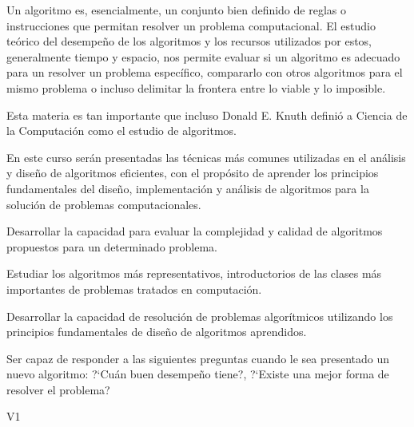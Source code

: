 \begin{syllabus}


\begin{justification}

    Un algoritmo es, esencialmente, un conjunto bien definido de reglas o instrucciones
    que permitan resolver un problema computacional. El estudio teórico del desempeño
    de los algoritmos y los recursos utilizados por estos, generalmente tiempo y espacio, 
    nos permite evaluar si un algoritmo es adecuado para un resolver un problema 
    específico, compararlo con otros algoritmos para el mismo problema o incluso
    delimitar la frontera entre lo viable y lo imposible.
    
    Esta materia es tan importante que incluso Donald E. Knuth definió a
    Ciencia de la Computación como el estudio de algoritmos.
    
    En este curso serán presentadas las técnicas más comunes utilizadas en el análisis y diseño de 
    algoritmos eficientes, con el propósito de aprender los principios fundamentales
    del diseño, implementación y análisis de algoritmos para la solución de problemas
    computacionales.
    \end{justification}
    
    \begin{goals} 
    \item Desarrollar la capacidad para evaluar la complejidad y calidad de algoritmos propuestos para un determinado problema.
    \item Estudiar los algoritmos más representativos, introductorios de las clases más importantes de problemas tratados en computación.
    \item Desarrollar la capacidad de resolución de problemas algorítmicos utilizando los principios fundamentales de diseño de algoritmos aprendidos.
    \item Ser capaz de responder a las siguientes preguntas cuando le sea presentado un nuevo algoritmo: ?`Cuán buen desempeño tiene?, ?`Existe una mejor forma de resolver el problema?
    \end{goals}
    
    \begin{outcomes}{V1}
        \item {} 
        \item {} 
    \end{outcomes}
    

\end{syllabus}
